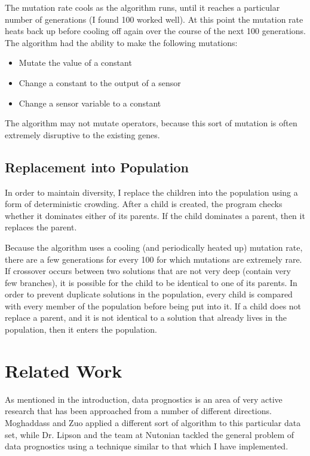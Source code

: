 \documentclass{acm_proc_article-sp}
\begin{document}
The mutation rate cools as the algorithm runs, until it reaches a particular number of generations (I found 100 worked well). At this point the mutation rate heats back up before cooling off again over the course of the next 100 generations. The algorithm had the ability to make the following mutations:

\begin{itemize}
\item Mutate the value of a constant
\item Change a constant to the output of a sensor
\item Change a sensor variable to a constant
\end{itemize}

The algorithm may not mutate operators, because this sort of mutation is often extremely disruptive to the existing genes.

\subsection{Replacement into Population}
In order to maintain diversity, I replace the children into the population using a form of deterministic crowding. After a child is created, the program checks whether it dominates either of its parents. If the child dominates a parent, then it replaces the parent.

Because the algorithm uses a cooling (and periodically heated up) mutation rate, there are a few generations for every 100 for which mutations are extremely rare. If crossover occurs between two solutions that are not very deep (contain very few branches), it is possible for the child to be identical to one of its parents. In order to prevent duplicate solutions in the population, every child is compared with every member of the population before being put into it. If a child does not replace a parent, and it is not identical to a solution that already lives in the population, then it enters the population.

\section{Related Work}
As mentioned in the introduction, data prognostics is an area of very active research that has been approached from a number of different directions. Moghaddass and Zuo applied a different sort of algorithm to this particular data set, while Dr. Lipson and the team at Nutonian tackled the general problem of data prognostics using a technique similar to that which I have implemented. \cite{Mog} \cite{nutonian}
\end{document}
